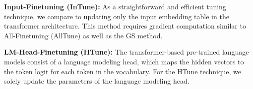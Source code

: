 \documentclass[11pt]{article}
\begin{document}

\textbf{Input-Finetuning (InTune):} As a straightforward and efficient tuning technique, we compare to updating only the input embedding table in the transformer architecture. This method requires gradient computation similar to All-Finetuning (AllTune) as well as the GS method.

\textbf{LM-Head-Finetuning (HTune):} The transformer-based pre-trained language models consist of a language modeling head, which maps the hidden vectors to the token logit for each token in the vocabulary. For the HTune technique, we solely update the parameters of the language modeling head.
\end{document}
